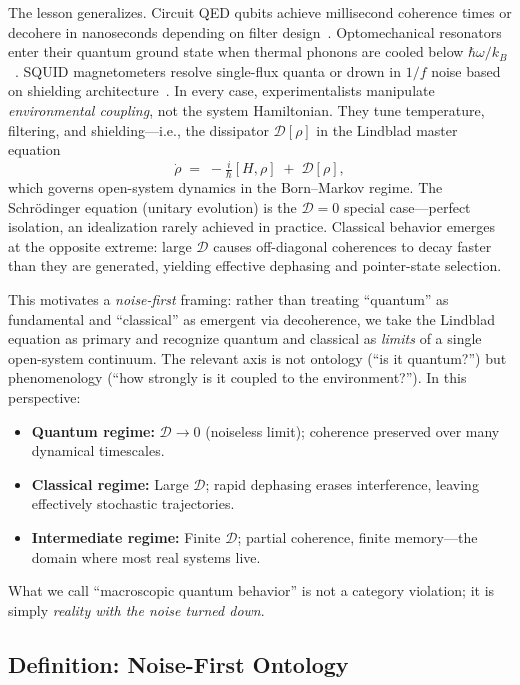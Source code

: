 \documentclass[11pt,letterpaper]{article}
\begin{document}
The lesson generalizes. Circuit QED qubits achieve millisecond coherence 
times or decohere in nanoseconds depending on filter 
design~\cite{blais2020_cqed}. Optomechanical resonators enter their 
quantum ground state when thermal phonons are cooled below 
$\hbar\omega/k_B$~\cite{oconnell2010}. SQUID magnetometers resolve 
single-flux quanta or drown in $1/f$ noise based on shielding 
architecture~\cite{clarke_squid_book}. In every case, experimentalists 
manipulate \emph{environmental coupling}, not the system Hamiltonian. 
They tune temperature, filtering, and shielding—i.e., the dissipator 
$\mathcal{D}[\rho]$ in the Lindblad master equation
\begin{equation}
\dot{\rho} \;=\; -\tfrac{i}{\hbar}[H,\rho] \;+\; \mathcal{D}[\rho],
\label{eq:lindblad}
\end{equation}
which governs open-system dynamics in the Born--Markov regime. The 
Schrödinger equation (unitary evolution) is the $\mathcal{D}=0$ special 
case—perfect isolation, an idealization rarely achieved in practice. 
Classical behavior emerges at the opposite extreme: large $\mathcal{D}$ 
causes off-diagonal coherences to decay faster than they are generated, 
yielding effective dephasing and pointer-state selection.

This motivates a \emph{noise-first} framing: rather than treating 
``quantum'' as fundamental and ``classical'' as emergent via decoherence, 
we take the Lindblad equation as primary and recognize quantum and 
classical as \emph{limits} of a single open-system continuum. The 
relevant axis is not ontology (``is it quantum?'') but phenomenology 
(``how strongly is it coupled to the environment?''). In this 
perspective:
\begin{itemize}[leftmargin=*,noitemsep,topsep=0pt]
\item \textbf{Quantum regime:} $\mathcal{D}\to 0$ (noiseless limit); 
coherence preserved over many dynamical timescales.
\item \textbf{Classical regime:} Large $\mathcal{D}$; rapid dephasing 
erases interference, leaving effectively stochastic trajectories.
\item \textbf{Intermediate regime:} Finite $\mathcal{D}$; partial 
coherence, finite memory—the domain where most real systems live.
\end{itemize}
What we call ``macroscopic quantum behavior'' is not a category
violation; it is simply \emph{reality with the noise turned down}.

\subsection{Definition: Noise-First Ontology}
\end{document}
